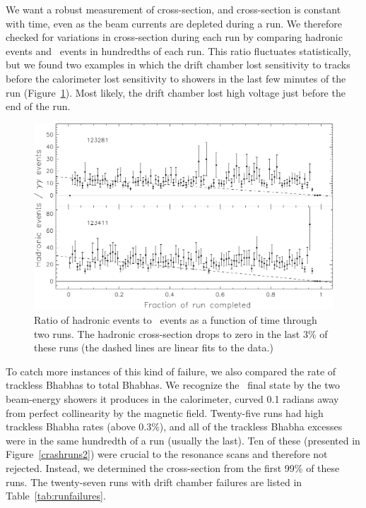 \documentclass{cornell}
\begin{document}
We want a robust measurement of cross-section, and cross-section is
constant with time, even as the beam currents are depleted during a
run.  We therefore checked for variations in cross-section during each
run by comparing hadronic events and \gamgam\ events in hundredths of
each run.  This ratio fluctuates statistically, but we found two
examples in which the drift chamber lost sensitivity to tracks before
the calorimeter lost sensitivity to showers in the last few minutes of
the run (Figure~\ref{crashruns}).  Most likely, the drift chamber lost
high voltage just before the end of the run.

\begin{figure}[p]
  \begin{center}
    \includegraphics[width=\linewidth]{plots/crashruns}
  \end{center}
  \caption[Two runs in which the hadronic cross-section dropped at the
  end of the run]{\label{crashruns} Ratio of hadronic events to \gamgam\ events
  as a function of time through two runs.  The hadronic cross-section
  drops to zero in the last 3\% of these runs (the dashed lines are
  linear fits to the data.)}
\end{figure}

To catch more instances of this kind of failure, we also compared the
rate of trackless Bhabhas to total Bhabhas.  We recognize the \ee\
final state by the two beam-energy showers it produces in the
calorimeter, curved 0.1 radians away from perfect collinearity by the
magnetic field.  Twenty-five runs had high trackless Bhabha rates
(above 0.3\%), and all of the trackless Bhabha excesses were in the
same hundredth of a run (usually the last).  Ten of these (presented
in Figure~\ref{crashruns2}) were crucial to the resonance scans and
therefore not rejected.  Instead, we determined the cross-section from
the first 99\% of these runs.  The twenty-seven runs with drift
chamber failures are listed in Table~\ref{tab:runfailures}.
\end{document}
